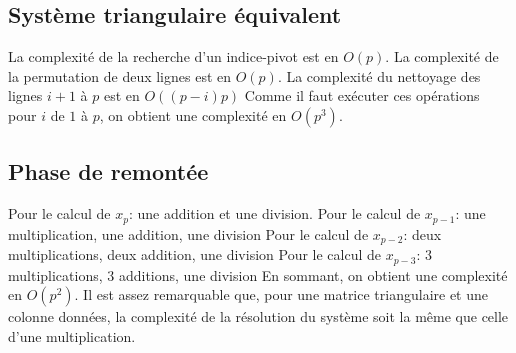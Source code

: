 \subsection{Système triangulaire équivalent}
La complexité de la recherche d'un indice-pivot est en $O(p)$.\newline
La complexité de la permutation de deux lignes est en $O(p)$.\newline
La complexité du nettoyage des lignes $i+1$ à $p$ est en $O((p-i)p)$\newline
Comme il faut exécuter ces opérations pour $i$ de $1$ à $p$, on obtient une complexité en $O(p^3)$. 
\subsection{Phase de remontée}
Pour le calcul de $x_p$: une addition et une division.\newline
Pour le calcul de $x_{p-1}$: une multiplication, une addition, une division\newline
Pour le calcul de $x_{p-2}$: deux multiplications, deux addition, une division\newline
Pour le calcul de $x_{p-3}$: $3$ multiplications, $3$ additions, une division\newline
En sommant, on obtient une complexité en $O(p^2)$. Il est assez remarquable que, pour une matrice triangulaire et une colonne données, la complexité de la résolution du système soit la même que celle d'une multiplication.


